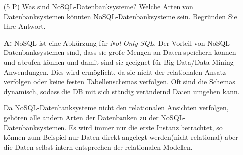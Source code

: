 \documentclass[12pt]{report}
\newcommand{\answer}{\textbf{A:}}
\begin{document}
\begin{enumerate}

\item[(5 P)] Was sind NoSQL-Datenbanksysteme? Welche Arten von Datenbanksystemen könnten NoSQL-Datenbanksysteme sein. Begründen Sie Ihre Antwort.
\item[\answer]
NoSQL ist eine Abkürzung für \textit{Not Only SQL}. Der Vorteil von NoSQL-Datenbanksystemen sind, dass sie große Mengen an Daten speichern können und abrufen können und damit sind sie geeignet für Big-Data/Data-Mining Anwendungen. Dies wird ermöglicht, da sie nicht der relationalen Ansatz verfolgen oder keine festen Tabellenschemas verfolgen. Oft sind die Schemas dynamisch, sodass die DB mit sich ständig verändernd Daten umgehen kann.

Da NoSQL-Datenbanksysteme nicht den relationalen Ansichten verfolgen, gehören alle andern Arten der Datenbanken zu der NoSQL-Datenbanksystemen. Es wird immer nur die erste Instanz betrachtet, so können zum Beispiel nur Daten direkt angelegt werden(nicht relational) aber die Daten selbst intern entsprechen der relationalen Modellen.


\end{enumerate}
\end{document}
